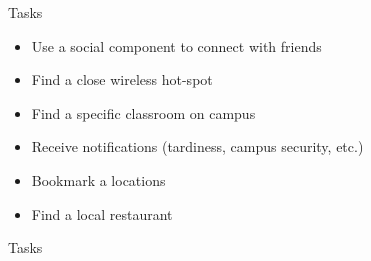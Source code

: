 \documentclass{beamer}
\begin{document}
\begin{frame}{Tasks}
\begin{itemize}
    \item Use a social component to connect with friends
    \item Find a close wireless hot-spot
    \item Find a specific classroom on campus
    \item Receive notifications (tardiness, campus security, etc.)
    \item Bookmark a locations
    \item Find a local restaurant
\end{itemize}
\end{frame}

\begin{frame}{Tasks}
    \begin{block}{}
    \end{block}
\end{frame}
\end{document}
